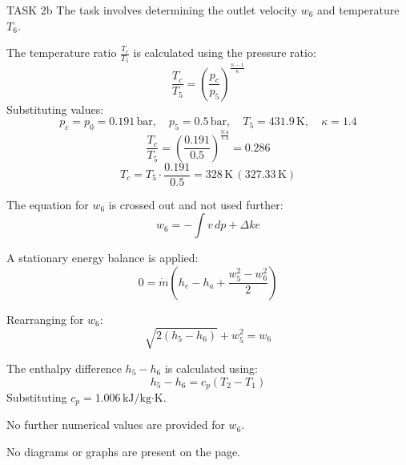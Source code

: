 TASK 2b  
The task involves determining the outlet velocity \( w_6 \) and temperature \( T_6 \).  

The temperature ratio \( \frac{T_c}{T_5} \) is calculated using the pressure ratio:  
\[
\frac{T_c}{T_5} = \left( \frac{p_c}{p_5} \right)^{\frac{\kappa - 1}{\kappa}}
\]  
Substituting values:  
\[
p_c = p_0 = 0.191 \, \text{bar}, \quad p_5 = 0.5 \, \text{bar}, \quad T_5 = 431.9 \, \text{K}, \quad \kappa = 1.4
\]  
\[
\frac{T_c}{T_5} = \left( \frac{0.191}{0.5} \right)^{\frac{0.4}{1.4}} = 0.286
\]  
\[
T_c = T_5 \cdot \frac{0.191}{0.5} = 328 \, \text{K} \, (327.33 \, \text{K})
\]  

The equation for \( w_6 \) is crossed out and not used further:  
\[
w_6 = - \int v \, dp + \Delta ke
\]  

A stationary energy balance is applied:  
\[
0 = \dot{m} \left( h_e - h_a + \frac{w_5^2 - w_6^2}{2} \right)
\]  

Rearranging for \( w_6 \):  
\[
\sqrt{2(h_5 - h_6)} + w_5^2 = w_6
\]  

The enthalpy difference \( h_5 - h_6 \) is calculated using:  
\[
h_5 - h_6 = c_p (T_2 - T_1)
\]  
Substituting \( c_p = 1.006 \, \text{kJ/kg·K} \).  

No further numerical values are provided for \( w_6 \).  

No diagrams or graphs are present on the page.